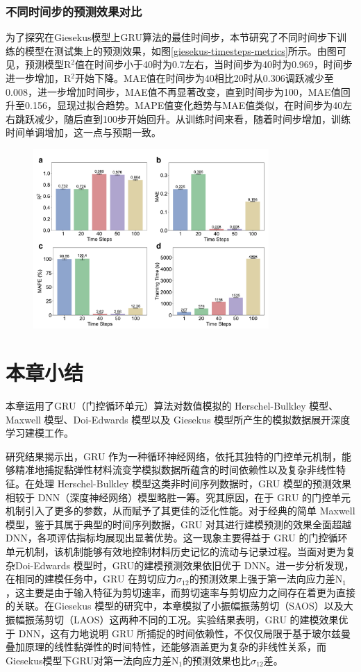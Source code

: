 \subsubsection{不同时间步的预测效果对比}
为了探究在Giesekus模型上GRU算法的最佳时间步，本节研究了不同时间步下训练的模型在测试集上的预测效果，如图\ref{giesekus-timesteps-metrics}所示。由图可见，预测模型R$^2$值在时间步小于40时为0.7左右，当时间步为40时为0.969，时间步进一步增加，R$^2$开始下降。MAE值在时间步为40相比20时从0.306调跃减少至0.008，进一步增加时间步，MAE值不再显著改变，直到时间步为100，MAE值回升至0.156，显现过拟合趋势。MAPE值变化趋势与MAE值类似，在时间步为40左右跳跃减少，随后直到100步开始回升。从训练时间来看，随着时间步增加，训练时间单调增加，这一点与预期一致。
\begin{figure}[htbp]
  \centering
  \includegraphics[width=0.8\textwidth]{Fig/giesekus-timesteps-metrics.pdf}
  \FigureBicaption{\label{giesekus-timesteps-metrics}}{}
\end{figure}
\section{本章小结}
本章运用了GRU（门控循环单元）算法对数值模拟的 Herschel-Bulkley 模型、Maxwell 模型、Doi-Edwards 模型以及 Giesekus 模型所产生的模拟数据展开深度学习建模工作。

研究结果揭示出，GRU 作为一种循环神经网络，依托其独特的门控单元机制，能够精准地捕捉黏弹性材料流变学模拟数据所蕴含的时间依赖性以及复杂非线性特征。在处理 Herschel-Bulkley 模型这类非时间序列数据时，GRU 模型的预测效果相较于 DNN（深度神经网络）模型略胜一筹。究其原因，在于 GRU 的门控单元机制引入了更多的参数，从而赋予了其更佳的泛化性能。对于经典的简单 Maxwell模型，鉴于其属于典型的时间序列数据，GRU 对其进行建模预测的效果全面超越DNN，各项评估指标均展现出显著优势。这一现象主要得益于 GRU 的门控循环单元机制，该机制能够有效地控制材料历史记忆的流动与记录过程。当面对更为复杂Doi-Edwards 模型时，GRU的建模预测效果依旧优于 DNN。进一步分析发现，在相同的建模任务中，GRU 在剪切应力$\sigma_{12}$的预测效果上强于第一法向应力差N$_1$，这主要是由于输入特征为剪切速率，而剪切速率与剪切应力之间存在着更为直接的关联。在Giesekus 模型的研究中，本章模拟了小振幅振荡剪切（SAOS）以及大振幅振荡剪切（LAOS）这两种不同的工况。实验结果表明，GRU 的建模效果优于 DNN，这有力地说明 GRU 所捕捉的时间依赖性，不仅仅局限于基于玻尔兹曼叠加原理的线性黏弹性的时间特性，还能够涵盖更为复杂的非线性关系，而Giesekus模型下GRU对第一法向应力差N$_1$的预测效果也比$\sigma_{12}$差。

